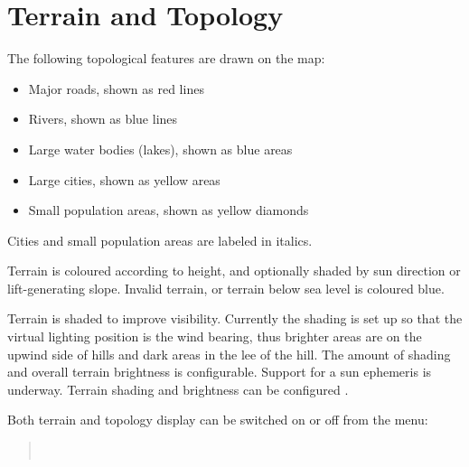 \documentclass[a4paper,12pt]{refrep}
\begin{document}
\section{Terrain and Topology}

The following topological features are drawn on the map:
\begin{itemize}
\item Major roads, shown as red lines
\item Rivers, shown as blue lines
\item Large water bodies (lakes), shown as blue areas
\item Large cities, shown as yellow areas
\item Small population areas, shown as yellow diamonds
\end{itemize}
Cities and small population areas are labeled in italics.

Terrain is coloured according to height, and optionally shaded by sun
direction or lift-generating slope.  Invalid terrain, or terrain below
sea level is coloured blue.

Terrain is shaded to improve visibility.  Currently the shading
is set up so that the virtual lighting position is the wind bearing,
thus brighter areas are on the upwind side of hills and dark areas in
the lee of the hill.  The amount of shading and overall terrain
brightness is configurable.  Support for a sun ephemeris is underway.
Terrain shading and brightness can be configured .

Both terrain and topology display can be switched on or off from the
menu:
\begin{quote}
\blink{}\blink{} \\
\blink{}\blink{}
\end{quote}
\end{document}
